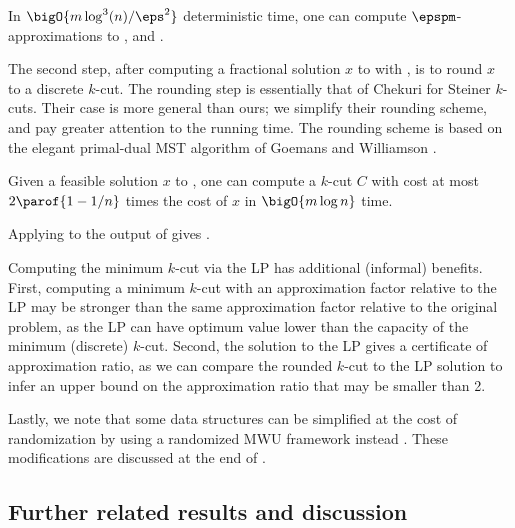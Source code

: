 \documentclass{toc}
\begin{document}
\begin{theorem}
  In $\bigO{m \log^3(n) / \eps^2}$ deterministic time, one can compute
  $\epspm$-approximations  %
  to ,  and
  .
\end{theorem}

The second step, after computing a fractional solution $x$ to
 with , is to round $x$ to a
discrete $k$-cut. The rounding step is essentially that of Chekuri
\etal \cite{cgn-06} for Steiner $k$-cuts. Their case is more general
than ours; we simplify their rounding scheme, and pay greater
attention to the running time. The rounding scheme is based on the
elegant primal-dual MST algorithm of Goemans and Williamson
\cite{gw-95}.
\begin{theorem}
   Given a feasible solution $x$ to
  , one can compute a $k$-cut $C$ with cost at most
  $2 \parof{1 - 1/n}$ times the cost of $x$ in $\bigO{m \log n}$ time.
\end{theorem}

Applying  to the output of 
gives .

Computing the minimum $k$-cut via the LP  has
additional (informal) benefits. First, computing a minimum $k$-cut
with an approximation factor relative to the LP may be stronger than
the same approximation factor relative to the original problem, as the
LP can have optimum value lower than the capacity of the minimum
(discrete) $k$-cut. Second, the solution to the LP gives a certificate
of approximation ratio, as we can compare the rounded $k$-cut to the
LP solution to infer an upper bound on the approximation ratio that
may be smaller than 2.

Lastly, we note that some data structures can be simplified at the
cost of randomization by using a randomized MWU framework instead
\cite{cq-18-soda}. These modifications are discussed at the end of
.

\subsection{Further related results and discussion}
\end{document}
